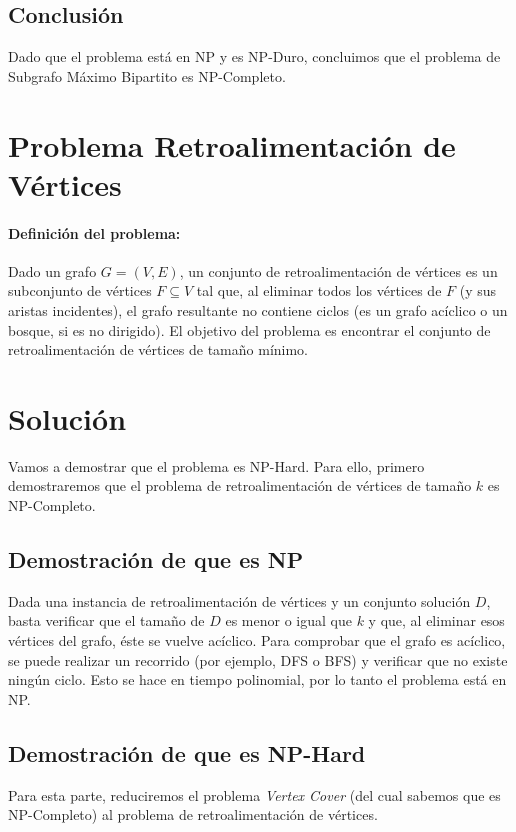 \documentclass[12pt]{article}
\begin{document}
\subsection*{Conclusión}

Dado que el problema está en NP y es NP-Duro, concluimos que el problema de Subgrafo Máximo Bipartito es NP-Completo.


\section*{Problema Retroalimentación de Vértices}

\paragraph{Definición del problema:}
Dado un grafo $G = (V, E)$, un conjunto de retroalimentación de vértices es un subconjunto 
de vértices $F \subseteq V$ tal que, al eliminar todos los vértices de $F$ (y sus aristas incidentes), 
el grafo resultante no contiene ciclos (es un grafo acíclico o un bosque, si es no dirigido). 
El objetivo del problema es encontrar el conjunto de retroalimentación de vértices de 
tamaño mínimo.

\section*{Solución}
Vamos a demostrar que el problema es NP-Hard. Para ello, primero demostraremos que 
el problema de retroalimentación de vértices de tamaño $k$ es NP-Completo.

\subsection*{Demostración de que es NP}
Dada una instancia de retroalimentación de vértices y un conjunto solución $D$, basta 
verificar que el tamaño de $D$ es menor o igual que $k$ y que, al eliminar esos vértices 
del grafo, éste se vuelve acíclico. Para comprobar que el grafo es acíclico, se puede 
realizar un recorrido (por ejemplo, DFS o BFS) y verificar que no existe ningún ciclo. 
Esto se hace en tiempo polinomial, por lo tanto el problema está en NP.

\subsection*{Demostración de que es NP-Hard}
Para esta parte, reduciremos el problema \textit{Vertex Cover} (del cual sabemos que es 
NP-Completo) al problema de retroalimentación de vértices.
\end{document}
